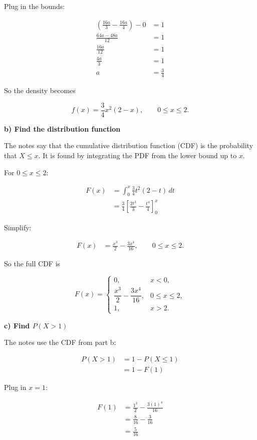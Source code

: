 \documentclass[10pt]{article}
\begin{document}
Plug in the bounds:

\begin{align*}
\left(
\frac{16a}{3}
-\frac{16a}{4}
\right)-0
&=1 \\[2mm]
\frac{64a-48a}{12}
&=1 \\[2mm]
\frac{16a}{12}
&=1 \\[2mm]
\frac{4a}{3}
&=1 \\[2mm]
a
&=\frac{3}{4}
\end{align*}

So the density becomes

\[
f(x)=\frac{3}{4}x^2(2-x),
\qquad 0\leq x\leq 2.
\]

\textbf{b) Find the distribution function}

The notes say that the cumulative distribution function
(CDF) is the probability that $X\leq x$.
It is found by integrating the PDF from the lower bound up
to $x$.

For $0\leq x\leq 2$:

\begin{align*}
F(x)
&=
\int_0^x
\frac{3}{4}t^2(2-t)\,dt \\[2mm]
&=
\frac{3}{4}
\left[
\frac{2t^3}{3}
-\frac{t^4}{4}
\right]_0^x
\end{align*}

Simplify:

\begin{align*}
F(x)
&=
\frac{x^3}{2}
-\frac{3x^4}{16},
\qquad 0\leq x\leq 2.
\end{align*}

So the full CDF is

\[
F(x)=
\begin{cases}
0,
& x<0,\\
\dfrac{x^3}{2}
-\dfrac{3x^4}{16},
& 0\leq x\leq 2,\\
1,
& x>2.
\end{cases}
\]

\textbf{c) Find $P(X>1)$}

The notes use the CDF from part b:

\begin{align*}
P(X>1)
&=1-P(X\leq 1) \\[2mm]
&=1-F(1)
\end{align*}

Plug in $x=1$:

\begin{align*}
F(1)
&=
\frac{1^3}{2}
-\frac{3(1)^4}{16} \\[2mm]
&=
\frac{8}{16}
-\frac{3}{16} \\[2mm]
&=
\frac{5}{16}
\end{align*}
\end{document}
